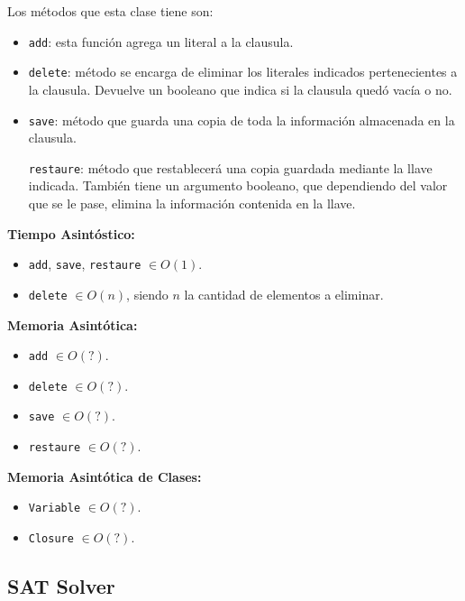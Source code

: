 \documentclass[letterpaper,12pt]{article}
\begin{document}
\begin{itemize}
	Los métodos que esta clase tiene son:
	\begin{itemize}
		\item \texttt{add}: esta función agrega un literal a la clausula.
		
		\item \texttt{delete}: método se encarga de eliminar los literales indicados pertenecientes a la clausula. Devuelve un booleano que indica si la clausula quedó vacía o no.
	    
	    \item \texttt{save}: método que guarda una copia de toda la información almacenada en la clausula.
	    
	    \texttt{restaure}: método que restablecerá una copia guardada mediante la llave indicada. También tiene un argumento booleano, que dependiendo del valor que se le pase, elimina la información contenida en  la llave.
	\end{itemize}
	
	\textbf{Tiempo Asintóstico:}
    \begin{itemize}
    	\item \texttt{add}, \texttt{save}, \texttt{restaure} $\in O(1)$.
    	
    	\item \texttt{delete} $\in O(n)$, siendo $n$ la cantidad de elementos a eliminar.
    \end{itemize} 
    
    \textbf{Memoria Asintótica:}
    \begin{itemize}
    	\item \texttt{add} $\in O(?)$.
    	\item \texttt{delete} $\in O(?)$.
    	\item \texttt{save} $\in O(?)$.
    	\item \texttt{restaure} $\in O(?)$.
    \end{itemize}

\end{itemize}

\textbf{Memoria Asintótica de Clases:} 
\begin{itemize}
	\item \texttt{Variable} $\in O(?)$.
	\item \texttt{Closure} $\in O(?)$.
\end{itemize}


\subsection{SAT Solver}
\end{document}
